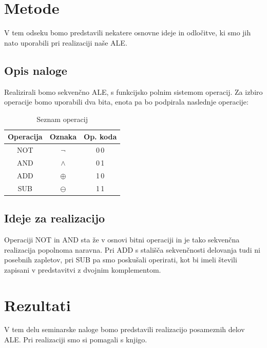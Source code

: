 \documentclass[seminar, slovene]{FRIreport}
\begin{document}
%
\section{Metode}
V tem odseku bomo predstavili nekatere osnovne ideje in odločitve, ki smo jih nato uporabili pri realizaciji naše ALE.

\subsection{Opis naloge}
Realizirali bomo sekvenčno ALE, s funkcijsko polnim sistemom operacij. Za izbiro operacije bomo uporabili dva bita, enota pa bo podpirala naslednje operacije:\\
\begin{table}[H]
\begin{center}
\begin{tabular}{ | c | c | c | }\hline
\textbf{Operacija} & \textbf{Oznaka} & \textbf{Op. koda} \\ \hline
NOT & $\lnot$ & 0\,0 \\
AND & $\wedge$ & 0\,1 \\
ADD & $\oplus$ & 1\,0 \\
SUB & $\ominus$ & 1\,1 \\ \hline
\end{tabular}
\caption{Seznam operacij}
\label{optable}
\end{center}
\end{table}
\subsection{Ideje za realizacijo}
Operaciji NOT in AND sta že v osnovi bitni operaciji in je tako sekvenčna realizacija popolnoma naravna. Pri ADD s stališča sekvenčnosti delovanja tudi ni posebnih zapletov, pri SUB pa smo poskušali operirati, kot bi imeli števili zapisani v predstavitvi z dvojnim komplementom.

%
\section{Rezultati}
V tem delu seminarske naloge bomo predstavili realizacijo posameznih delov ALE. Pri realizaciji smo si pomagali s knjigo\cite{virant:2007}.
\end{document}
